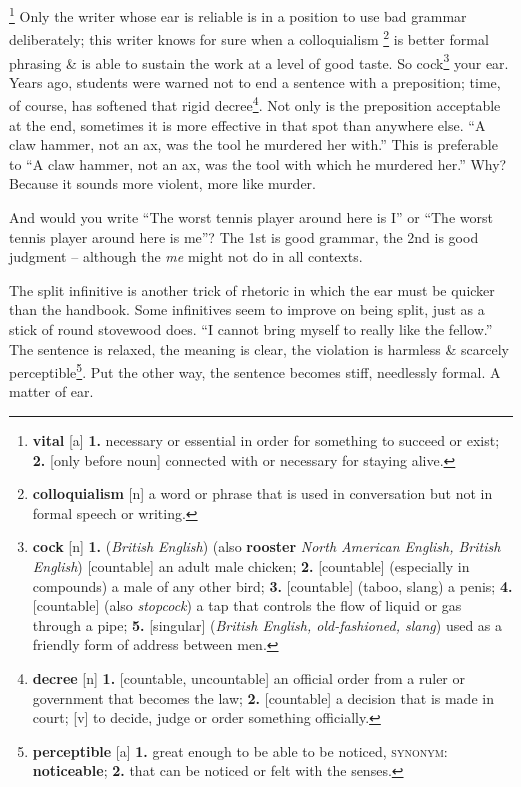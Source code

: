 \documentclass[oneside]{book}
\numberwithin{equation}{section}
\begin{document}
\footnote{\textbf{vital} [a] \textbf{1.} necessary or essential in order for something to succeed or exist; \textbf{2.} [only before noun] connected with or necessary for staying alive.} Only the writer whose ear is reliable is in a position to use bad grammar deliberately; this writer knows for sure when a colloquialism \footnote{\textbf{colloquialism} [n] a word or phrase that is used in conversation but not in formal speech or writing.} is better formal phrasing \& is able to sustain the work at a level of good taste. So cock\footnote{\textbf{cock} [n] \textbf{1.} (\textit{British English}) (also \textbf{rooster} \textit{North American English, British English}) [countable] an adult male chicken; \textbf{2.} [countable] (especially in compounds) a male of any other bird; \textbf{3.} [countable] (taboo, slang) a penis; \textbf{4.} [countable] (also \textit{stopcock}) a tap that controls the flow of liquid or gas through a pipe; \textbf{5.} [singular] (\textit{British English, old-fashioned, slang}) used as a friendly form of address between men.} your ear. Years ago, students were warned not to end a sentence with a preposition; time, of course, has softened that rigid decree\footnote{\textbf{decree} [n] \textbf{1.} [countable, uncountable] an official order from a ruler or government that becomes the law; \textbf{2.} [countable] a decision that is made in court; [v] to decide, judge or order something officially.}. Not only is the preposition acceptable at the end, sometimes it is more effective in that spot than anywhere else. ``A claw hammer, not an ax, was the tool he murdered her with.'' This is preferable to ``A claw hammer, not an ax, was the tool with which he murdered her.'' Why? Because it sounds more violent, more like murder. 

And would you write ``The worst tennis player around here is I'' or ``The worst tennis player around here is me''? The 1st is good grammar, the 2nd is good judgment -- although the \textit{me} might not do in all contexts.

The split infinitive is another trick of rhetoric in which the ear must be quicker than the handbook. Some infinitives seem to improve on being split, just as a stick of round stovewood does. ``I cannot bring myself to really like the fellow.'' The sentence is relaxed, the meaning is clear, the violation is harmless \& scarcely perceptible\footnote{\textbf{perceptible} [a] \textbf{1.} great enough to be able to be noticed, \textsc{synonym}: \textbf{noticeable}; \textbf{2.} that can be noticed or felt with the senses.}. Put the other way, the sentence becomes stiff, needlessly formal. A matter of ear.
\end{document}
